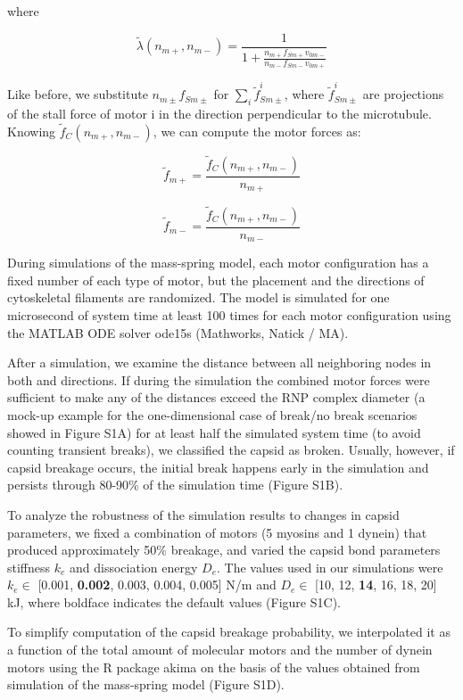 where

\begin{equation}
\tilde{\lambda}(n_{m+}, n_{m-}) = \frac{1}{1+\frac{n_{m+}f_{Sm+}v_{0m-}}{n_{m-}f_{Sm-}v_{0m+}}}
\end{equation}
 
Like before, we substitute $n_{m\pm}f_{Sm\pm}$ for $\sum_{i}\tilde{f}^i_{Sm\pm}$, where $\tilde{f}^i_{Sm\pm}$ are projections of the stall force of motor i in the direction perpendicular to the microtubule. Knowing $\tilde{f}_C(n_{m+}, n_{m-})$, we can compute the motor forces as:

\begin{equation}
\tilde{f}_{m+} = \frac{\tilde{f}_C(n_{m+}, n_{m-})}{n_{m+}}
\end{equation}

\begin{equation}
\tilde{f}_{m-} = \frac{\tilde{f}_C(n_{m+}, n_{m-})}{n_{m-}}
\end{equation}
 
During simulations of the mass-spring model, each motor configuration has a fixed number of each type of motor, but the placement and the directions of cytoskeletal filaments are randomized. The model is simulated for one microsecond of system time at least 100 times for each motor configuration using the MATLAB ODE solver ode15s (Mathworks, Natick / MA).

After a simulation, we examine the distance between all neighboring nodes in both   and   directions. If during the simulation the combined motor forces were sufficient to make any of the distances exceed the RNP complex diameter (a mock-up example for the one-dimensional case of break/no break scenarios showed in Figure S1A) for at least half the simulated system time (to avoid counting transient breaks), we classified the capsid as broken. Usually, however, if capsid breakage occurs, the initial break happens early in the simulation and persists through 80-90\% of the simulation time (Figure S1B).

To analyze the robustness of the simulation results to changes in capsid parameters, we fixed a combination of motors (5 myosins and 1 dynein) that produced approximately 50\% breakage, and varied the capsid bond parameters stiffness $k_e$ and dissociation energy $D_e$. The values used in our simulations were $k_e \in$ [0.001, \textbf{0.002}, 0.003, 0.004, 0.005] N/m and $D_e \in$ [10, 12, \textbf{14}, 16, 18, 20] kJ, where boldface indicates the default values (Figure S1C).

To simplify computation of the capsid breakage probability, we interpolated it as a function of the total amount of molecular motors and the number of dynein motors using the R package akima on the basis of the values obtained from simulation of the mass-spring model (Figure S1D).
